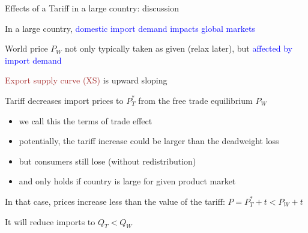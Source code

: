 \documentclass[notes,11pt, aspectratio=169, xcolor=table]{beamer}
\newcommand{\blue}[1]{\textcolor{blue}{#1}}
\newenvironment{wideitemize}{\itemize\addtolength{\itemsep}{10pt}}{\enditemize}
\begin{document}
\begin{frame}{Effects of a Tariff in a large country: discussion}
\begin{wideitemize}
    \item In a large country, \blue{domestic import demand impacts global markets}

    \item<2-> World price $P_W$ not only typically taken as given (relax later), but \blue{affected by import demand}

    \item<3-> \textcolor{brown}{Export supply curve (XS)} is upward sloping

    \item<4-> Tariff decreases import prices to $P_T^*$ from the free trade equilibrium $P_W$ 
    \begin{itemize}
        \item we call this the terms of trade effect
        \item potentially, the tariff increase could be larger than the deadweight loss
        \item but consumers still lose (without redistribution)
        \item and only holds if country is large for given product market
    \end{itemize}
    \item<5-> In that case, prices increase less than the value of the tariff: $P = P_T^* + t < P_W + t $

    \item<6-> It will reduce imports to $Q_T< Q_W$
\end{wideitemize}
\end{frame}
\end{document}
